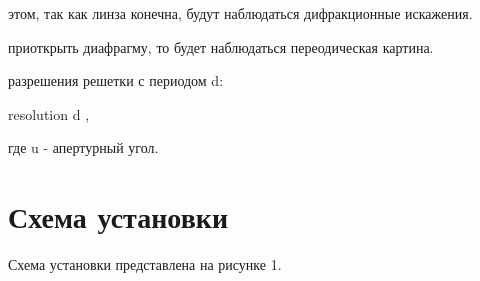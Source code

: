  этом, так как линза конечна, будут наблюдаться дифракционные искажения.

 приоткрыть диафрагму, то будет наблюдаться переодическая картина.

 разрешения решетки с периодом d:

\formula
{resolution}
{d \geq {},}

где u - апертурный угол.

\section{Схема установки}

Схема установки представлена на рисунке 1. \\


\newpage
